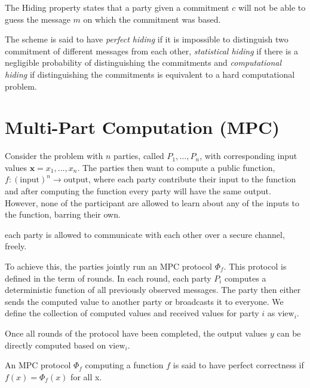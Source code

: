\begin{definition}[hiding]
The Hiding property states that a party given a commitment $c$ will not be able
to guess the message $m$ on which the commitment was based.

The scheme is said to have \textit{perfect hiding} if it is impossible to
distinguish two commitment of different messages from each other,
\textit{statistical hiding} if there is a negligible probability of
distinguishing the commitments and \textit{computational hiding} if
distinguishing the commitments is equivalent to a hard computational problem.
\end{definition}


\section{Multi-Part Computation (MPC)}
\label{sec:background:mpc}
Consider the problem with $n$ parties, called $P_{1}, \dots, P_{n}$, with
corresponding input values $\textbf{x} = x_{1}, \dots, x_{n}$.
The parties then want to compute a public function,
$f : (\text{input})^{n} \rightarrow \text{output}$, where each party contribute
their input to the function and after computing the function every party will
have the same output. However, none of the participant are allowed to learn
about any of the inputs to the function, barring their own.

each party is allowed to communicate with each other over a secure channel, freely.

To achieve this, the parties jointly run an MPC protocol $\Phi_{f}$. This protocol
is defined in the term of rounds.
In each round, each party $P_{i}$ computes
a deterministic function of all previously observed messages.
The party then either sends the computed value to another party or broadcasts it to everyone.
We define the collection of computed values and received values for party $i$ as $\text{view}_{i}$.

Once all rounds of the protocol have been completed, the output values $y$ can be
directly computed based on $\text{view}_{i}$.



\begin{definition}[correctness]
  \label{def:mpc:correctness}
  An MPC protocol $\Phi_{f}$ computing a function $f$ is said to have perfect
  correctness if $f(x) = \Phi_{f}(x)$ for all x.
\end{definition}

